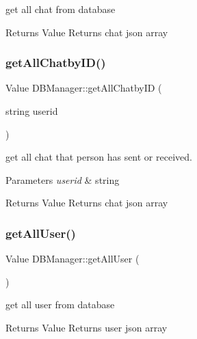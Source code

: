 get all chat from database 

\begin{DoxyReturn}{Returns}
Value Returns chat json array 
\end{DoxyReturn}
\mbox{\label{class_d_b_manager_af90bbc5f97ee7bb051006178c5e6834b}} 
\subsubsection{\texorpdfstring{get\+All\+Chatby\+I\+D()}{getAllChatbyID()}}
{\footnotesize\ttfamily Value D\+B\+Manager\+::get\+All\+Chatby\+ID (\begin{DoxyParamCaption}\item[{string}]{userid }\end{DoxyParamCaption})}



get all chat that person has sent or received. 


\begin{DoxyParams}{Parameters}
{\em userid} & string \\
\hline
\end{DoxyParams}
\begin{DoxyReturn}{Returns}
Value Returns chat json array 
\end{DoxyReturn}
\mbox{\label{class_d_b_manager_a0171d3489ef375c9eeff4014a4a485de}} 
\subsubsection{\texorpdfstring{get\+All\+User()}{getAllUser()}}
{\footnotesize\ttfamily Value D\+B\+Manager\+::get\+All\+User (\begin{DoxyParamCaption}{ }\end{DoxyParamCaption})}



get all user from database 

\begin{DoxyReturn}{Returns}
Value Returns user json array 
\end{DoxyReturn}
\mbox{\label{class_d_b_manager_ae4df9e089ce729370abd432af32ab0a5}} 
